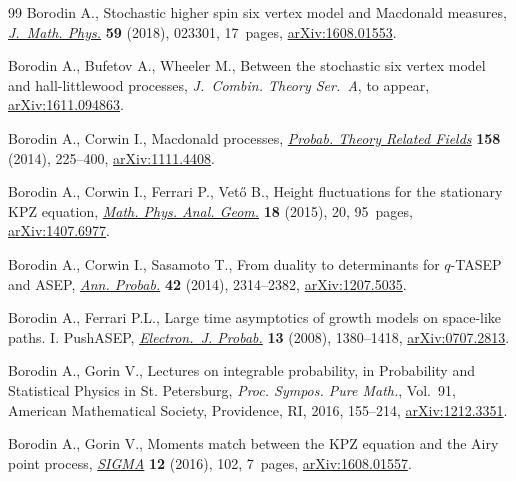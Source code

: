 \documentclass[pdftex]{sigma}
\numberwithin{equation}{section}
\begin{document}
\begin{thebibliography}{99}
Borodin A., Stochastic higher spin six vertex model and {M}acdonald measures,
 \href{https://doi.org/10.1063/1.5000046}{\textit{J.~Math. Phys.}} \textbf{59} (2018), 023301, 17~pages,
 \href{https://arxiv.org/abs/1608.01553}{arXiv:1608.01553}.

Borodin A., Bufetov A., Wheeler M., Between the stochastic six vertex model and
 hall-littlewood processes, \textit{J.~Combin. Theory Ser.~A}, {t}o appear,
 \href{https://arxiv.org/abs/1611.094863}{arXiv:1611.094863}.

Borodin A., Corwin I., Macdonald processes, \href{https://doi.org/10.1007/s00440-013-0482-3}{\textit{Probab. Theory Related
 Fields}} \textbf{158} (2014), 225--400, \href{https://arxiv.org/abs/1111.4408}{arXiv:1111.4408}.

Borodin A., Corwin I., Ferrari P., Vet\H{o} B., Height fluctuations for the
 stationary {KPZ} equation, \href{https://doi.org/10.1007/s11040-015-9189-2}{\textit{Math. Phys. Anal. Geom.}} \textbf{18}
 (2015), 20, 95~pages, \href{https://arxiv.org/abs/1407.6977}{arXiv:1407.6977}.

Borodin A., Corwin I., Sasamoto T., From duality to determinants for
 {$q$}-{TASEP} and {ASEP}, \href{https://doi.org/10.1214/13-AOP868}{\textit{Ann. Probab.}} \textbf{42} (2014),
 2314--2382, \href{https://arxiv.org/abs/1207.5035}{arXiv:1207.5035}.

Borodin A., Ferrari P.L., Large time asymptotics of growth models on space-like
 paths. {I}. {P}ush{ASEP}, \href{https://doi.org/10.1214/EJP.v13-541}{\textit{Electron.~J. Probab.}} \textbf{13} (2008),
 1380--1418, \href{https://arxiv.org/abs/0707.2813}{arXiv:0707.2813}.

Borodin A., Gorin V., Lectures on integrable probability, in Probability and
 {S}tatistical {P}hysics in {S}t. {P}etersburg, \textit{Proc. Sympos. Pure
 Math.}, Vol.~91, American Mathematical Society, Providence, RI, 2016,
 155--214, \href{https://arxiv.org/abs/1212.3351}{arXiv:1212.3351}.

Borodin A., Gorin V., Moments match between the {KPZ} equation and the {A}iry
 point process, \href{https://doi.org/10.3842/SIGMA.2016.102}{\textit{SIGMA}} \textbf{12} (2016), 102, 7~pages,
 \href{https://arxiv.org/abs/1608.01557}{arXiv:1608.01557}.


\end{thebibliography}
\end{document}
